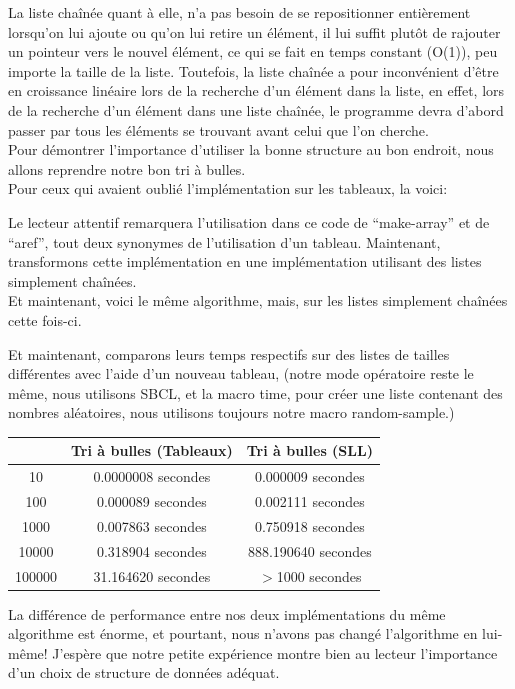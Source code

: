 \documentclass[a4paper, 12pt]{article}
\numberwithin{equation}{subsection}
\begin{document}
La liste chaînée quant à elle, n'a pas besoin de se repositionner entièrement lorsqu'on lui ajoute ou qu'on lui retire un élément, il lui suffit plutôt de rajouter un pointeur vers le nouvel élément, ce qui se fait en temps constant (O(1)), peu importe la taille de la liste. Toutefois, la liste chaînée a pour inconvénient d'être en croissance linéaire lors de la recherche d'un élément dans la liste, en effet, lors de la recherche d'un élément dans une liste chaînée, le programme devra d'abord passer par tous les éléments se trouvant avant celui que l'on cherche. \\

Pour démontrer l'importance d'utiliser la bonne structure au bon endroit, nous allons reprendre notre bon tri à bulles. \\

Pour ceux qui avaient oublié l'implémentation sur les tableaux, la voici:

Le lecteur attentif remarquera l'utilisation dans ce code de ``make-array'' et de ``aref'', tout deux synonymes de l'utilisation d'un tableau. Maintenant, transformons cette implémentation en une implémentation utilisant des listes simplement chaînées. \\
Et maintenant, voici le même algorithme, mais, sur les listes simplement chaînées cette fois-ci.

Et maintenant, comparons leurs temps respectifs sur des listes de tailles différentes avec l'aide d'un nouveau tableau, (notre mode opératoire reste le même, nous utilisons SBCL, et la macro time, pour créer une liste contenant des nombres aléatoires, nous utilisons toujours notre macro random-sample.)
\begin{table}[H]
  \centering
  \begin{tabular}{|c|c|c|}
    \hline & Tri à bulles (Tableaux) & Tri à bulles (SLL) \\
    \hline 10 &  0.0000008 secondes &  0.000009 secondes \\
    \hline 100 &  0.000089 secondes &  0.002111 secondes \\
    \hline 1000 & 0.007863 secondes &  0.750918 secondes \\
    \hline 10000 & 0.318904 secondes & 888.190640 secondes \\
    \hline 100000 &  31.164620 secondes & $>$1000 secondes \\
    \hline
  \end{tabular}
\end{table}
La différence de performance entre nos deux implémentations du même algorithme est énorme, et pourtant, nous n'avons pas changé l'algorithme en lui-même! J'espère que notre petite expérience montre bien au lecteur l'importance d'un choix de structure de données adéquat.
\end{document}
